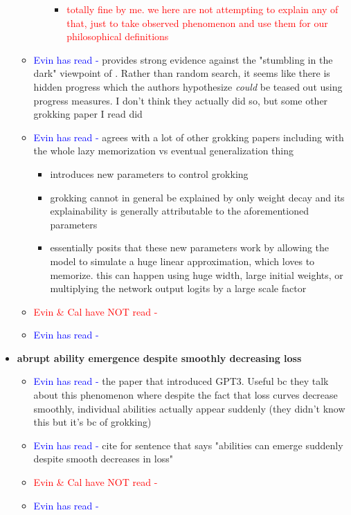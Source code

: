 \documentclass{article}
\begin{document}
\begin{itemize}
\begin{itemize}
\begin{itemize}
\begin{itemize}
                \item \textcolor{red}{totally fine by me. we here are not attempting to explain any of that, just to take observed phenomenon and use them for our philosophical definitions}
            \end{itemize}
        \end{itemize}
        \item \textcolor{blue}{Evin has read -} \cite{barak2022hidden} provides strong evidence against the "stumbling in the dark" viewpoint of \cite{millidge2022gg}. Rather than random search, it seems like there is hidden progress which the authors hypothesize \textit{could} be teased out using progress measures. I don't think they actually did so, but some other grokking paper I read did
        \item \textcolor{blue}{Evin has read -} \cite{kumar2023grokking} agrees with a lot of other grokking papers including \cite{varma2023explaining} with the whole lazy memorization vs eventual generalization thing
        \begin{itemize}
            \item introduces new parameters to control grokking
            \item grokking cannot in general be explained by only weight decay and its explainability is generally attributable to the aforementioned parameters
            \item essentially posits that these new parameters work by allowing the model to simulate a huge linear approximation, which loves to memorize. this can happen using huge width, large initial weights, or multiplying the network output logits by a large scale factor
        \end{itemize}
        \item \textcolor{red}{Evin \& Cal have NOT read - }
        \item \textcolor{blue}{Evin has read -}
    \end{itemize}

    \item \textbf{abrupt ability emergence despite smoothly decreasing loss}
    \begin{itemize}
        \item \textcolor{blue}{Evin has read -} \cite{brown2020language} the paper that introduced GPT3. Useful bc they talk about this phenomenon where despite the fact that loss curves decrease smoothly, individual abilities actually appear suddenly (they didn't know this but it's bc of grokking)
        \item \textcolor{blue}{Evin has read -} \cite{wei2022emergent} cite for sentence that says "abilities can emerge suddenly despite smooth decreases in loss"
        \item \textcolor{red}{Evin \& Cal have NOT read - }
        \item \textcolor{blue}{Evin has read -}
    \end{itemize}


\end{itemize}
\end{document}
